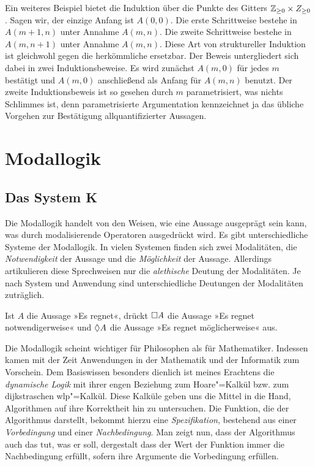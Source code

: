 Ein weiteres Beispiel bietet die Induktion über die Punkte des
Gitters $\mathbb Z_{\ge 0}\times Z_{\ge 0}$. Sagen wir, der einzige
Anfang ist $A(0,0)$. Die erste Schrittweise bestehe in $A(m+1,n)$
unter Annahme $A(m,n)$. Die zweite Schrittweise bestehe in $A(m,n+1)$
unter Annahme $A(m,n)$. Diese Art von struktureller Induktion ist
gleichwohl gegen die herkömmliche ersetzbar. Der Beweis untergliedert
sich dabei in zwei Induktionsbeweise. Es wird zunächst
$A(m,0)$ für jedes $m$ bestätigt und $A(m,0)$ anschließend als
Anfang für $A(m,n)$ benutzt. Der zweite Induktionsbeweis ist so gesehen
durch $m$ parametrisiert, was nichts Schlimmes ist, denn
parametrisierte Argumentation kennzeichnet ja das übliche Vorgehen
zur Bestätigung allquantifizierter Aussagen.

\newpage
\section{Modallogik}

\subsection{Das System K}

Die Modallogik handelt von den Weisen, wie eine Aussage ausgeprägt sein
kann, was durch modalisierende Operatoren ausgedrückt wird. Es gibt
unterschiedliche Systeme der Modallogik. In vielen Systemen finden sich
zwei Modalitäten, die \emph{Notwendigkeit} der Aussage und die
\emph{Möglichkeit} der Aussage. Allerdings artikulieren diese Sprechweisen
nur die \emph{alethische} Deutung der Modalitäten. Je nach System und
Anwendung sind unterschiedliche Deutungen der Modalitäten zuträglich.

Ist $A$ die Aussage »Es regnet«, drückt $\Box A$ die Aussage
»Es regnet notwendigerweise« und $\Diamond A$ die Aussage
»Es regnet möglicherweise« aus.

Die Modallogik scheint wichtiger für Philosophen als für
Mathematiker. Indessen kamen mit der Zeit Anwendungen in der
Mathematik und der Informatik zum Vorschein. Dem Basiswissen besonders
dienlich ist meines Erachtens die \emph{dynamische Logik} mit
ihrer engen Beziehung zum Hoare"=Kalkül bzw. zum dijkstraschen wlp"=Kalkül.
Diese Kalküle geben uns die Mittel in die Hand, Algorithmen auf ihre Korrektheit
hin zu untersuchen. Die Funktion, die der Algorithmus darstellt, bekommt
hierzu eine \emph{Spezifikation}, bestehend aus einer \emph{Vorbedingung}
und einer \emph{Nachbedingung}. Man zeigt nun, dass der Algorithmus auch
das tut, was er soll, dergestalt dass der Wert der Funktion immer die
Nachbedingung erfüllt, sofern ihre Argumente die Vorbedingung erfüllen.

